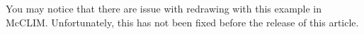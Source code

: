 \documentclass[twocolumn,a4paper]{article}
\newcommand {\code}[1]{{\sffamily #1}}
\newcommand {\CLIM}{{\small CLIM}}
\let\method\code
\begin{document}
% 
% 
% 
% 
% 
% 
% 
% 
% 
% 
% 
% 
You may notice that there are issue with redrawing with this example in McCLIM. Unfortunately, this has not been fixed before the release of this article.
\end{document}
